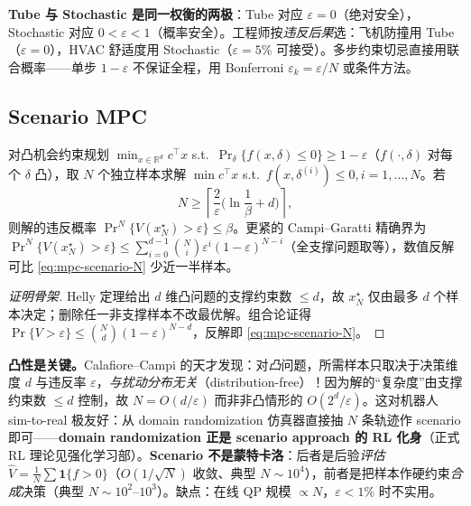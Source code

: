 \begin{insight}
\textbf{Tube 与 Stochastic 是同一权衡的两极}：Tube 对应 $\varepsilon=0$（绝对安全），Stochastic 对应 $0<\varepsilon<1$（概率安全）。工程师按\emph{违反后果}选：飞机防撞用 Tube（$\varepsilon=0$），HVAC 舒适度用 Stochastic（$\varepsilon=5\%$ 可接受）。多步约束切忌直接用联合概率——单步 $1-\varepsilon$ 不保证全程，用 Bonferroni $\varepsilon_k=\varepsilon/N$ 或条件方法。
\end{insight}

\subsection{Scenario MPC}
\label{sec:mpc-scenario}
\begin{theorem}
\label{thm:mpc-scenario}
对凸机会约束规划 $\min_{x\in\mathbb R^d}c^\top x$ s.t.\ $\Pr_\delta\{f(x,\delta)\le0\}\ge1-\varepsilon$（$f(\cdot,\delta)$ 对每个 $\delta$ 凸），取 $N$ 个独立样本求解 $\min c^\top x$ s.t.\ $f(x,\delta^{(i)})\le0,i=1,\dots,N$。若
\begin{equation}
  N\ge\left\lceil\frac{2}{\varepsilon}\Big(\ln\frac1\beta+d\Big)\right\rceil,
  \label{eq:mpc-scenario-N}
\end{equation}
则解的违反概率 $\Pr^N\{V(x_N^\star)>\varepsilon\}\le\beta$。更紧的 Campi--Garatti 精确界为 $\Pr^N\{V(x_N^\star)>\varepsilon\}\le\sum_{i=0}^{d-1}\binom Ni\varepsilon^i(1-\varepsilon)^{N-i}$（全支撑问题取等），数值反解可比 \cref{eq:mpc-scenario-N} 少近一半样本。
\end{theorem}

\begin{proof}[证明骨架]
Helly 定理给出 $d$ 维凸问题的支撑约束数 $\le d$，故 $x_N^\star$ 仅由最多 $d$ 个样本决定；删除任一非支撑样本不改最优解。组合论证得 $\Pr\{V>\varepsilon\}\le\binom Nd(1-\varepsilon)^{N-d}$，反解即 \cref{eq:mpc-scenario-N}。
\end{proof}

\begin{insight}
\textbf{凸性是关键。}\;Calafiore--Campi 的天才发现：对\emph{凸}问题，所需样本只取决于决策维度 $d$ 与违反率 $\varepsilon$，\emph{与扰动分布无关}（distribution-free）！因为解的“复杂度”由支撑约束数 $\le d$ 控制，故 $N=O(d/\varepsilon)$ 而非非凸情形的 $O(2^d/\varepsilon)$。这对机器人 sim-to-real 极友好：从 domain randomization 仿真器直接抽 $N$ 条轨迹作 scenario 即可——\textbf{domain randomization 正是 scenario approach 的 RL 化身}（正式 RL 理论见强化学习部）。\textbf{Scenario 不是蒙特卡洛}：后者是后验\emph{评估} $\hat V=\tfrac1N\sum\mathbf 1\{f>0\}$（$O(1/\sqrt N)$ 收敛、典型 $N\sim10^4$），前者是把样本作硬约束\emph{合成}决策（典型 $N\sim10^2$--$10^3$）。缺点：在线 QP 规模 $\propto N$，$\varepsilon<1\%$ 时不实用。
\end{insight}

